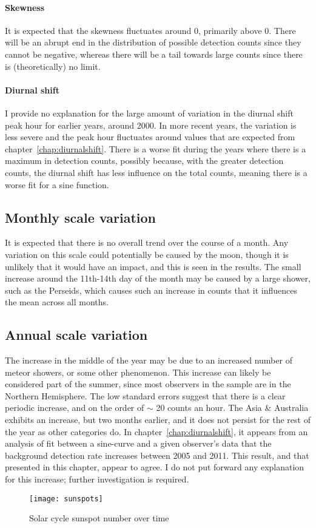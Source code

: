 \paragraph{Skewness\\}
It is expected that the skewness fluctuates around 0, primarily above 0. There will be an abrupt end in the distribution of possible detection counts since they cannot be negative, whereas there will be a tail towards large counts since there is (theoretically) no limit.
\paragraph{Diurnal shift\\}
I provide no explanation for the large amount of variation in the diurnal shift peak hour for earlier years, around 2000. In more recent years, the variation is less severe and the peak hour fluctuates around values that are expected from chapter~\ref{chap:diurnalshift}. There is a worse fit during the years where there is a maximum in detection counts, possibly because, with the greater detection counts, the diurnal shift has less influence on the total counts, meaning there is a worse fit for a sine function.
\subsection{Monthly scale variation}
It is expected that there is no overall trend over the course of a month. Any variation on this scale could potentially be caused by the moon, though it is unlikely that it would have an impact, and this is seen in the results. The small increase around the 11th-14th day of the month may be caused by a large shower, such as the Perseids, which causes such an increase in counts that it influences the mean across all months.
\subsection{Annual scale variation}
The increase in the middle of the year may be due to an increased number of meteor showers, or some other phenomenon. This increase can likely be considered part of the summer, since most observers in the sample are in the Northern Hemisphere. The low standard errors suggest that there is a clear periodic increase, and on the order of $\sim$ 20 counts an hour. The Asia \& Australia exhibits an increase, but two months earlier, and it does not persist for the rest of the year as other categories do. In chapter~\ref{chap:diurnalshift}, it appears from an analysis of fit between a sine-curve and a given observer's data that the background detection rate increases between 2005 and 2011. This result, and that presented in this chapter, appear to agree. I do not put forward any explanation for this increase; further investigation is required.
\begin{figure}[h!]
	\centering
	\texttt{[image: sunspots]}
	\caption{Solar cycle sunspot number over time \cite{sunspot}
		\label{fig:temp:sunspot}}
\end{figure}
